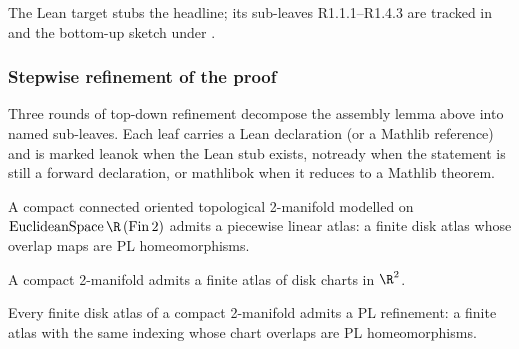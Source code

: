 \begin{lemma}
\label{lem:rado-overview-stepwise}
The Lean target  stubs
the headline; its sub-leaves R1.1.1--R1.4.3 are tracked in
 and the bottom-up sketch
under .
\leanok
\end{lemma}


\subsubsection*{Stepwise refinement of the proof}

Three rounds of top-down refinement decompose the assembly
lemma above into named sub-leaves.  Each leaf carries a Lean
declaration (or a Mathlib reference) and is marked
\textsf{leanok} when the Lean stub exists, \textsf{notready}
when the statement is still a forward declaration, or
\textsf{mathlibok} when it reduces to a Mathlib theorem.

\begin{lemma}
\label{lem:rado-pl-atlas-exists}
A compact connected oriented topological 2-manifold modelled on $\mathrm{EuclideanSpace}\,\R\,(\mathrm{Fin}\,2)$ admits a piecewise linear atlas: a finite disk atlas whose overlap maps are PL homeomorphisms.
\leanok
\end{lemma}

\begin{lemma}
\label{lem:rado-finite-disk-atlas}
A compact 2-manifold admits a finite atlas of disk charts in $\R^{2}$.
\leanok
\end{lemma}

\begin{lemma}
\label{lem:rado-pl-refinement-induction}
Every finite disk atlas of a compact 2-manifold admits a PL refinement: a finite atlas with the same indexing whose chart overlaps are PL homeomorphisms.
\leanok
\end{lemma}

